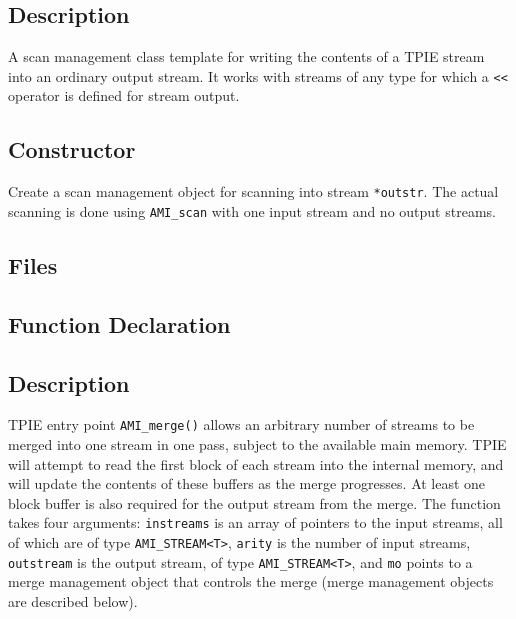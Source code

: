 \subsection{Description}
A scan management class template for writing the contents of a TPIE
stream into an ordinary \CPP{} output stream.  It works with streams
of any type for which a \lstinline|<<| operator is defined for \CPP{}
stream output.

\subsection{Constructor} 
\btabb {}
{Create a scan management object for scanning into \CPP{} stream
  \lstinline|*outstr|. The actual scanning is done using
  \lstinline|AMI_scan| with one input stream and no output streams.}
\etabb

\clearpage


\subsection{Files}
  \btabb
     {}
  \etabb

\subsection{Function Declaration}
  \btabb
     {}
  \etabb

\subsection{Description}
TPIE entry point \lstinline|AMI_merge()| allows an arbitrary number of
streams to be merged into one stream in one pass, subject to the
available main memory.  TPIE will attempt to read the first block of each
stream into the internal memory, and will update the contents of these
buffers as the merge progresses. At least one block buffer is also
required for the output stream from the merge.  The function takes
four arguments: \lstinline|instreams| is an array of pointers to the
input streams, all of which are of type \lstinline|AMI_STREAM<T>|,
\lstinline|arity| is the number of input streams,
\lstinline|outstream| is the output stream, of type
\lstinline|AMI_STREAM<T>|, and \lstinline|mo| points to a merge
management object that controls the merge (merge management objects
are described below).

